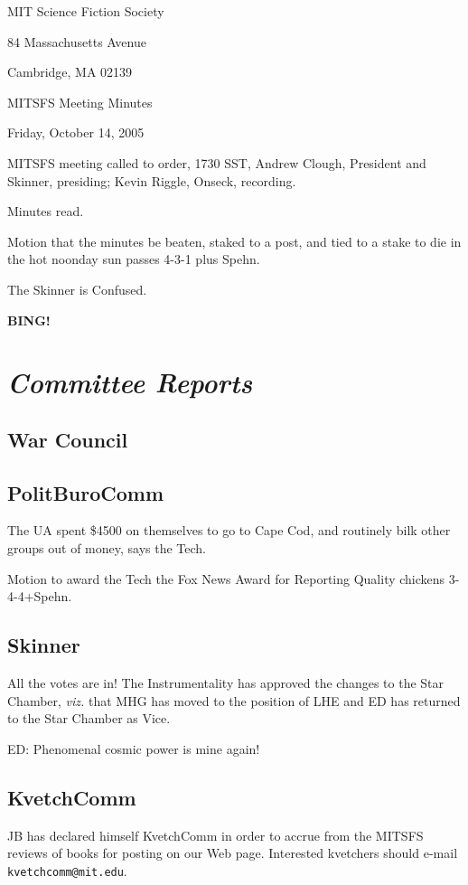 \documentclass[10pt]{article}
\newcommand{\bing}{{\bf BING!} }
\newcommand{\goto}[1]{\bing \vskip 12pt \section*{{\em{#1}}}}
\newcommand{\ps}{ plus Spehn\xspace}
\begin{document}
\begin{center}

MIT Science Fiction Society

84 Massachusetts Avenue

Cambridge, MA 02139

\vspace{12pt}

MITSFS Meeting Minutes

Friday, October 14, 2005

\end{center}

\vspace{18pt}

\setlength{\parskip}{6pt}

\noindent
MITSFS meeting called to order, 1730 SST, Andrew Clough, President and 
Skinner, presiding; Kevin Riggle,  Onseck, recording.

Minutes read.

Motion that the minutes be beaten, staked to a post, and tied to a stake
to die in the hot noonday sun passes 4-3-1\ps.

The Skinner is Confused.

\goto{Committee Reports}
\subsection*{War Council}

\subsection*{PolitBuroComm}
The UA spent \$4500 on themselves to go to Cape Cod, and routinely bilk other groups out of 
money, says the Tech.

Motion to award the Tech the Fox News Award for Reporting Quality chickens 3-4-4+Spehn.

\subsection*{Skinner}
All the votes are in!  The Instrumentality has approved the changes to the Star Chamber, 
\emph{viz.} that MHG has moved to the position of LHE and ED has returned to the Star Chamber
as Vice.

ED: Phenomenal cosmic power is mine again!

\subsection*{KvetchComm}
JB has declared himself KvetchComm in order to accrue from the MITSFS reviews of books for
posting on our Web page.  Interested kvetchers should e-mail {\tt kvetchcomm@mit.edu}.
\end{document}

